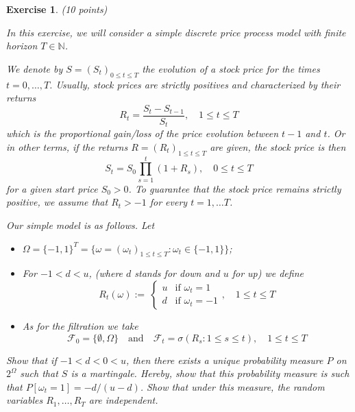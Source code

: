 \documentclass[DIV=classic,a4paper,10pt]{scrartcl}
\newtheorem{exercise}[theorem]{Exercise}
\theoremstyle{nonumberplain}
\numberwithin{equation}{section}
\begin{document}
\begin{exercise}(10 points)

    In this exercise, we will consider a simple discrete price process model with finite horizon $T \in \mathbb{N}$.
    
    We denote by $S=(S_{t})_{0\leq t\leq T}$ the evolution of a stock price for the times $t=0,\ldots ,T$.
    Usually, stock prices are strictly positives and characterized by their returns
    \begin{equation*}
        R_t = \frac{S_{t}-S_{t-1}}{S_t}, \quad 1\leq t\leq T
    \end{equation*}
    which is the proportional gain/loss of the price evolution between $t-1$ and $t$.
    Or in other terms, if the returns $R=(R_t)_{1\leq t\leq T}$ are given, the stock price is then
    \begin{equation*}
        S_t=S_0\prod_{s=1}^t\left( 1+R_s \right), \quad 0\leq t\leq T
    \end{equation*}
    for a given start price $S_0>0$.
    To guarantee that the stock price remains strictly positive, we assume that $R_t>-1$ for every $t=1,\ldots T$.

    Our simple model is as follows.
    Let 
    \begin{itemize}
        \item $\Omega =\{-1,1\}^T=\{\omega=(\omega_t)_{1\leq t\leq T}\colon \omega_t \in \{-1,1\}\}$;
        \item For $-1<d<u$, (where $d$ stands for down and $u$ for up) we define
            \begin{equation*}
                R_t(\omega):= \
                \begin{cases}
                    u&\text{if }\omega_t=1\\
                    d&\text{if }\omega_t=-1
                \end{cases},\quad 1\leq t\leq T
            \end{equation*}
        \item As for the filtration we take
            \begin{equation*}
                \mathcal{F}_0=\{\emptyset,\Omega\}\quad \text{and}\quad \mathcal{F}_t=\sigma(R_s\colon 1\leq s\leq t),\quad 1\leq t\leq T
            \end{equation*}
    \end{itemize}
    Show that if $-1<d<0<u$, then there exists a unique probability measure $P$ on $2^{\Omega}$ such that $S$ is a martingale.
    Hereby, show that this probability measure is such that $P[\omega_t=1]=-d/(u-d)$.
    Show that under this measure, the random variables $R_1,\ldots, R_T$ are independent.
\end{exercise}
\end{document}
